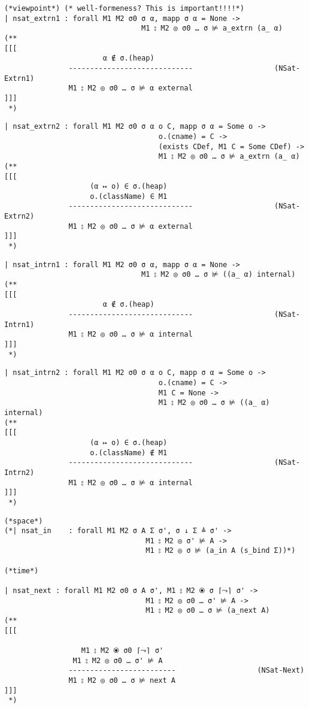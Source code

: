\documentclass[12pt]{article}
\begin{document}
\begin{verbatim}
(*viewpoint*) (* well-formeness? This is important!!!!*)
| nsat_extrn1 : forall M1 M2 σ0 σ α, mapp σ α = None ->
                                M1 ⦂ M2 ◎ σ0 … σ ⊭ a_extrn (a_ α)
(**
[[[
                       α ∉ σ.(heap)
               -----------------------------                   (NSat-Extrn1)
               M1 ⦂ M2 ◎ σ0 … σ ⊭ α external
]]]
 *)
\end{verbatim}
\begin{verbatim}
| nsat_extrn2 : forall M1 M2 σ0 σ α o C, mapp σ α = Some o ->
                                    o.(cname) = C ->
                                    (exists CDef, M1 C = Some CDef) ->
                                    M1 ⦂ M2 ◎ σ0 … σ ⊭ a_extrn (a_ α)
(**
[[[
                    (α ↦ o) ∈ σ.(heap)
                    o.(className) ∈ M1
               -----------------------------                   (NSat-Extrn2)
               M1 ⦂ M2 ◎ σ0 … σ ⊭ α external
]]]
 *)
\end{verbatim}
\begin{verbatim}
| nsat_intrn1 : forall M1 M2 σ0 σ α, mapp σ α = None ->
                                M1 ⦂ M2 ◎ σ0 … σ ⊭ ((a_ α) internal)
(**
[[[
                       α ∉ σ.(heap)
               -----------------------------                   (NSat-Intrn1)
               M1 ⦂ M2 ◎ σ0 … σ ⊭ α internal
]]]
 *)
\end{verbatim}
\begin{verbatim}
| nsat_intrn2 : forall M1 M2 σ0 σ α o C, mapp σ α = Some o ->
                                    o.(cname) = C ->
                                    M1 C = None ->
                                    M1 ⦂ M2 ◎ σ0 … σ ⊭ ((a_ α) internal)
(**
[[[
                    (α ↦ o) ∈ σ.(heap)
                    o.(className) ∉ M1
               -----------------------------                   (NSat-Intrn2)
               M1 ⦂ M2 ◎ σ0 … σ ⊭ α internal
]]]
 *)
\end{verbatim}
\begin{verbatim}
(*space*)
(*| nsat_in    : forall M1 M2 σ A Σ σ', σ ↓ Σ ≜ σ' ->
                                 M1 ⦂ M2 ◎ σ' ⊭ A ->
                                 M1 ⦂ M2 ◎ σ ⊭ (a_in A (s_bind Σ))*)

(*time*)

| nsat_next : forall M1 M2 σ0 σ A σ', M1 ⦂ M2 ⦿ σ ⌈⤳⌉ σ' ->
                                 M1 ⦂ M2 ◎ σ0 … σ' ⊭ A ->
                                 M1 ⦂ M2 ◎ σ0 … σ ⊭ (a_next A)
(**
[[[
                    
                  M1 ⦂ M2 ⦿ σ0 ⌈⤳⌉ σ'
                M1 ⦂ M2 ◎ σ0 … σ' ⊭ A
               -------------------------                   (NSat-Next)
               M1 ⦂ M2 ◎ σ0 … σ ⊭ next A
]]]
 *)
\end{verbatim}
\end{document}
